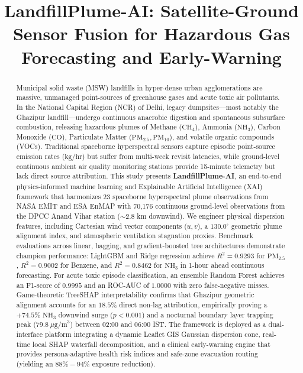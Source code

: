 \documentclass[conference]{IEEEtran}
\begin{document}
\title{LandfillPlume-AI: Satellite-Ground Sensor Fusion for Hazardous Gas Forecasting and Early-Warning}

\author{
}

\maketitle

\begin{abstract}
Municipal solid waste (MSW) landfills in hyper-dense urban agglomerations are massive, unmanaged point-sources of greenhouse gases and acute toxic air pollutants. In the National Capital Region (NCR) of Delhi, legacy dumpsites---most notably the Ghazipur landfill---undergo continuous anaerobic digestion and spontaneous subsurface combustion, releasing hazardous plumes of Methane ($\text{CH}_4$), Ammonia ($\text{NH}_3$), Carbon Monoxide ($\text{CO}$), Particulate Matter ($\text{PM}_{2.5}, \text{PM}_{10}$), and volatile organic compounds (VOCs). Traditional spaceborne hyperspectral sensors capture episodic point-source emission rates ($\text{kg/hr}$) but suffer from multi-week revisit latencies, while ground-level continuous ambient air quality monitoring stations provide 15-minute telemetry but lack direct source attribution. This study presents \textbf{LandfillPlume-AI}, an end-to-end physics-informed machine learning and Explainable Artificial Intelligence (XAI) framework that harmonizes 23 spaceborne hyperspectral plume observations from NASA EMIT and ESA EnMAP with 70,176 continuous ground-level observations from the DPCC Anand Vihar station ($\sim$2.8 km downwind). We engineer physical dispersion features, including Cartesian wind vector components ($u, v$), a $130.0^\circ$ geometric plume alignment index, and atmospheric ventilation stagnation proxies. Benchmark evaluations across linear, bagging, and gradient-boosted tree architectures demonstrate champion performance: LightGBM and Ridge regression achieve $R^2 = 0.9293$ for $\text{PM}_{2.5}$, $R^2 = 0.9002$ for Benzene, and $R^2 = 0.8462$ for $\text{NH}_3$ in 1-hour ahead continuous forecasting. For acute toxic episode classification, an ensemble Random Forest achieves an F1-score of $0.9995$ and an ROC-AUC of $1.0000$ with zero false-negative misses. Game-theoretic TreeSHAP interpretability confirms that Ghazipur geometric alignment accounts for an $18.5\%$ direct non-lag attribution, empirically proving a $+74.5\%$ $\text{NH}_3$ downwind surge ($p < 0.001$) and a nocturnal boundary layer trapping peak ($79.8\ \mu\text{g/m}^3$) between 02:00 and 06:00 IST. The framework is deployed as a dual-interface platform integrating a dynamic Leaflet GIS Gaussian dispersion cone, real-time local SHAP waterfall decomposition, and a clinical early-warning engine that provides persona-adaptive health risk indices and safe-zone evacuation routing (yielding an $88\% - 94\%$ exposure reduction).
\end{abstract}
\end{document}
